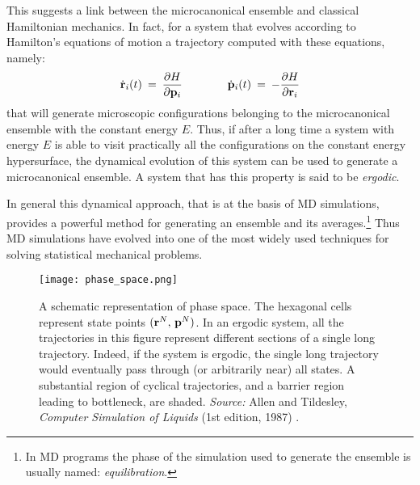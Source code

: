 This suggests a link between the microcanonical ensemble and classical Hamiltonian mechanics. In fact, for a system that evolves according to Hamilton's equations of motion a trajectory computed with these equations, namely:
\begin{equation}\label{eq:hamilton}
\dot{\bold{r}}_i(t) \:=\: \frac{\partial H}{\partial \bold{p}_i} \qquad \qquad \dot{\bold{p}}_i(t) \:=\: - \frac{\partial H}{\partial \bold{r}_i}
\end{equation}
that will generate microscopic configurations belonging to the microcanonical ensemble with the constant energy $E$. Thus, if after a long time a system with energy $E$ is able to visit practically all the configurations on the constant energy hypersurface, the dynamical evolution of this system can be used to generate a microcanonical ensemble. A system that has this property is said to be \textit{ergodic}.

In general this dynamical approach, that is at the basis of MD simulations, provides a powerful method for generating an ensemble and its averages.\footnote{In MD programs the phase of the simulation used to generate the ensemble is usually named: \textit{equilibration}.} Thus MD simulations have evolved into one of the most widely used techniques for solving statistical mechanical problems.

\begin{figure}[H]
\centering
\begin{minipage}[t]{0.8\textwidth}
	\centering
    \texttt{[image: phase\_space.png]}
    
    \footnotesize{\caption{A schematic representation of phase space. The hexagonal cells represent state points $( \bold{r}^N, \, \bold{p}^N )$. In an ergodic system, all the trajectories in this figure represent different sections of a single long trajectory. Indeed, if the system is ergodic, the single long trajectory would eventually pass through (or arbitrarily near) all states. A substantial region of cyclical trajectories, and a barrier region leading to bottleneck, are shaded. 
    \textit{Source:} Allen and Tildesley, \textit{Computer Simulation of Liquids} (1st edition, 1987) 
    \cite{ref:AllenTildesley_1ed}.}
    \label{fig:generation-of-microcan_state}
    }
\end{minipage} 
\end{figure}

